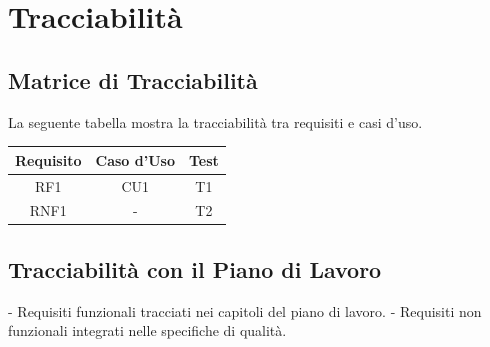 \chapter{Tracciabilità}

\section{Matrice di Tracciabilità}

La seguente tabella mostra la tracciabilità tra requisiti e casi d'uso.

\begin{tabular}{|c|c|c|}
\hline
Requisito & Caso d'Uso & Test \\
\hline
RF1 & CU1 & T1 \\
\hline
RNF1 & - & T2 \\
\hline
\end{tabular}

\section{Tracciabilità con il Piano di Lavoro}

- Requisiti funzionali tracciati nei capitoli del piano di lavoro.
- Requisiti non funzionali integrati nelle specifiche di qualità.